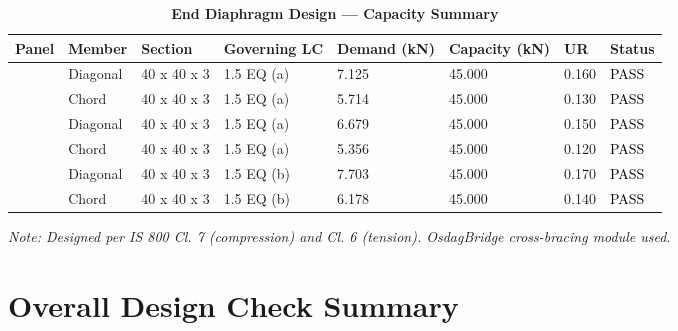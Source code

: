 \documentclass[12pt,a4paper]{report}
\numberwithin{table}{chapter}
\numberwithin{figure}{chapter}
\begin{document}
\vspace{1em}

\begin{longtable}{|C{2.0cm}|L{1.8cm}|C{2.2cm}|C{3.0cm}|C{1.8cm}|C{1.8cm}|C{1.2cm}|C{1.8cm}|}
\caption{\textbf{End Diaphragm Design --- Capacity Summary}}
\hline
\textbf{Panel} & \textbf{Member} & \textbf{Section} & \textbf{Governing LC} & \textbf{Demand (kN)} & \textbf{Capacity (kN)} & \textbf{UR} & \textbf{Status} \\[6pt]
\hline
{} & Diagonal & 40 x 40 x 3 & 1.5 EQ (a) & 7.125 & 45.000 & 0.160 & \textcolor{black}{PASS} \\[6pt]
 & Chord & 40 x 40 x 3 & 1.5 EQ (a) & 5.714 & 45.000 & 0.130 & \textcolor{black}{PASS} \\[6pt]
\hline
{} & Diagonal & 40 x 40 x 3 & 1.5 EQ (a) & 6.679 & 45.000 & 0.150 & \textcolor{black}{PASS} \\[6pt]
 & Chord & 40 x 40 x 3 & 1.5 EQ (a) & 5.356 & 45.000 & 0.120 & \textcolor{black}{PASS} \\[6pt]
\hline
{} & Diagonal & 40 x 40 x 3 & 1.5 EQ (b) & 7.703 & 45.000 & 0.170 & \textcolor{black}{PASS} \\[6pt]
 & Chord & 40 x 40 x 3 & 1.5 EQ (b) & 6.178 & 45.000 & 0.140 & \textcolor{black}{PASS} \\[6pt]
\hline
\end{longtable}
\noindent\textit{Note: Designed per IS 800 Cl. 7 (compression) and Cl. 6 (tension). OsdagBridge cross-bracing module used.}

\section{Overall Design Check Summary}
\label{sec:overall-summary}
\end{document}
